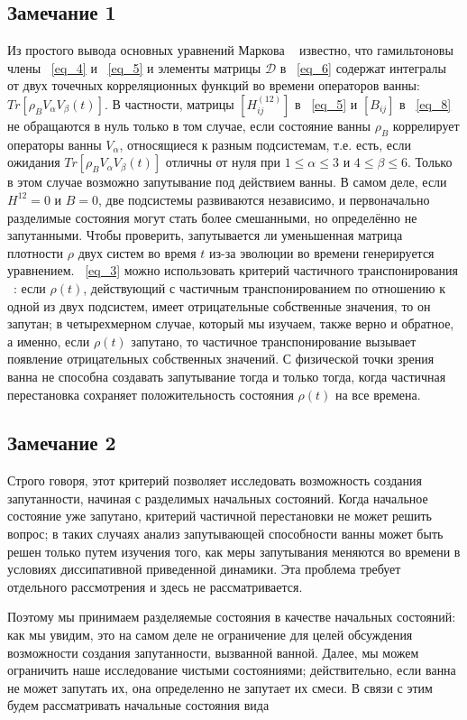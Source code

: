 \documentclass[11pt]{article}
\begin{document}
\subsection{Замечание 1}
Из простого вывода основных уравнений Маркова ~\cite{b7,b8} известно, что гамильтоновы члены ~\ref{eq_4} и ~\ref{eq_5} и элементы матрицы $\mathscr{D}$ в ~\ref{eq_6} содержат интегралы от двух точечных корреляционных функций во времени операторов ванны: $Tr[\rho_BV_\alpha V_{\beta}(t)]$. В частности, матрицы $[H_{ij}^{(12)}]$ в ~\ref{eq_5} и $[B_{ij}]$ в ~\ref{eq_8} не обращаются в нуль только в том случае, если состояние ванны $\rho_B$ коррелирует операторы ванны $V_\alpha$, относящиеся к разным подсистемам, т.е. есть, если ожидания $Tr[\rho_BV_\alpha V_\beta(t)]$ отличны от нуля при $1 \le \alpha \le 3$ и $4 \le \beta \le 6$. Только в этом случае возможно запутывание под действием ванны. В самом деле, если $H^{12}=0$ и $B=0$, две подсистемы развиваются независимо, и первоначально разделимые состояния могут стать более смешанными, но определённо не запутанными. Чтобы проверить, запутывается ли уменьшенная матрица плотности $\rho$ двух систем во время $t$ из-за эволюции во времени генерируется уравнением. ~\ref{eq_3} можно использовать критерий частичного транспонирования ~\cite{14,15}: если $\rho(t)$, действующий с частичным транспонированием по отношению к одной из двух подсистем, имеет отрицательные собственные значения, то он запутан; в четырехмерном случае, который мы изучаем, также верно и обратное, а именно, если $\rho(t)$ запутано, то частичное транспонирование вызывает появление отрицательных собственных значений. С физической точки зрения ванна не способна создавать запутывание тогда и только тогда, когда частичная перестановка сохраняет положительность состояния $\rho(t)$ на все времена.

\subsection{Замечание 2}
Строго говоря, этот критерий позволяет исследовать возможность создания запутанности, начиная с разделимых начальных состояний. Когда начальное состояние уже запутано, критерий частичной перестановки не может решить вопрос; в таких случаях анализ запутывающей способности ванны может быть решен только путем изучения того, как меры запутывания меняются во времени в условиях диссипативной приведенной динамики. Эта проблема требует отдельного рассмотрения и здесь не рассматривается.

Поэтому мы принимаем разделяемые состояния в качестве начальных состояний: как мы увидим, это на самом деле не ограничение для целей обсуждения возможности создания запутанности, вызванной ванной. Далее, мы можем ограничить наше исследование чистыми состояниями; действительно, если ванна не может запутать их, она определенно не запутает их смеси. В связи с этим будем рассматривать начальные состояния вида
\end{document}
